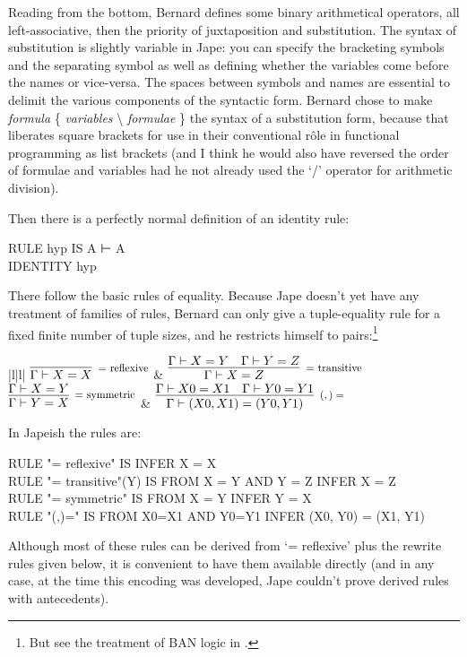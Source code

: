 Reading from the bottom, Bernard defines some binary arithmetical operators, all left-associative, then the priority of juxtaposition and substitution. The syntax of substitution is slightly variable in Jape: you can specify the bracketing symbols and the separating symbol as well as defining whether the variables come before the names or vice-versa. The spaces between symbols and names are essential to delimit the various components of the syntactic form. Bernard chose to make \textit{formula} \{ \textit{variables} \textbackslash\; \textit{formulae} \} the syntax of a substitution form, because that liberates square brackets for use in their conventional r\^{o}le in functional programming as list brackets (and I think he would also have reversed the order of formulae and variables had he not already used the `/' operator for arithmetic division).

Then there is a perfectly normal definition of an identity rule:
\begin{japeish}
RULE hyp IS A ⊢ A \\
IDENTITY hyp
\end{japeish}
There follow the basic rules of equality. Because Jape doesn't yet have any treatment of families of rules, Bernard can only give a tuple-equality rule for a fixed finite number of tuple sizes, and he restricts himself to pairs:\footnote{But see the treatment of BAN logic in .}

\begin{ruletab}{|l|l|}
\hline
$\infer[\reason{$=$ reflexive}]
       {\Gamma  |- X=X}
       {}$
& 
$\infer[\reason{$=$ transitive}]
       {\Gamma  |- X=Z}
       {\Gamma  |- X=Y\quad \Gamma  |- Y=Z}$
\\
\hline
$\infer[\reason{$=$ symmetric}]
       {\Gamma  |- Y=X}
       {\Gamma  |- X=Y}$
& 
$\infer[\reason{$(,)=$}]
       {\Gamma  |- (X0,X1)=(Y0,Y1)}
       {\Gamma  |- X0=X1\quad \Gamma  |- Y0=Y1}$
\\
\hline
\end{ruletab}


In Japeish the rules are:
\begin{japeish}
RULE "= reflexive"          IS                                  INFER X = X\\
RULE "= transitive"(Y)      IS FROM X = Y AND Y = Z             INFER X = Z\\
RULE "= symmetric"          IS FROM X = Y                       INFER Y = X\\
RULE "(,)="                 IS FROM X0=X1 AND Y0=Y1 INFER (X0, Y0) = (X1, Y1)
\end{japeish}
Although most of these rules can be derived from `= reflexive' plus the rewrite rules given below, it is convenient to have them available directly (and in any case, at the time this encoding was developed, Jape couldn't prove derived rules with antecedents). 

